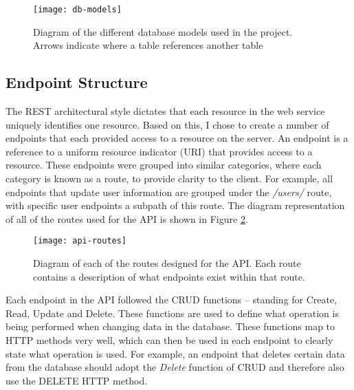 
\begin{figure}[hbt]
  \centering
  \texttt{[image: db-models]}
  \caption{Diagram of the different database models used in the project. Arrows indicate where a table references another table}
  \label{fig:db-models}
\end{figure}

\subsection{Endpoint Structure}

The REST architectural style dictates that each resource in the web service uniquely identifies one resource. Based on this, I chose to create a number of endpoints that each provided access to a resource on the server. An endpoint is a reference to a uniform resource indicator (URI) that provides access to a resource. These endpoints were grouped into similar categories, where each category is known as a route, to provide clarity to the client. For example, all endpoints that update user information are grouped under the \textit{/users/} route, with specific user endpoints a subpath of this route. The diagram representation of all of the routes used for the API is shown in Figure \ref{fig:api-routes}.

\begin{figure}[hbt]
  \centering
  \texttt{[image: api-routes]}
  \caption{Diagram of each of the routes designed for the API. Each route contains a description of what endpoints exist within that route.}
  \label{fig:api-routes}
\end{figure}

Each endpoint in the API followed the CRUD functions -- standing for Create, Read, Update and Delete. These functions are used to define what operation is being performed when changing data in the database. These functions map to HTTP methods very well, which can then be used in each endpoint to clearly state what operation is used. For example, an endpoint that deletes certain data from the database should adopt the \textit{Delete} function of CRUD and therefore also use the DELETE HTTP method.
 



